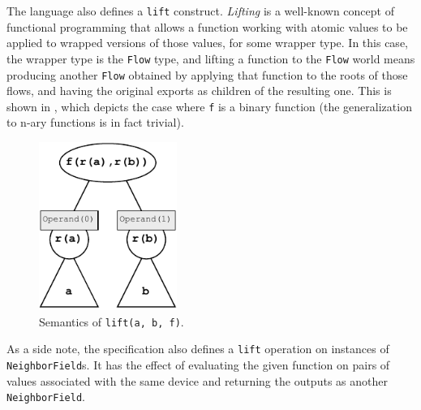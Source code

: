 The language also defines a \texttt{lift} construct.
%
\textit{Lifting} is a well-known concept of functional programming that allows a function working with atomic values to be applied to wrapped versions of those values, for some wrapper type.
%
In this case, the wrapper type is the \texttt{Flow} type, and lifting a function to the \texttt{Flow} world means producing another \texttt{Flow} obtained by applying that function to the roots of those flows, and having the original exports as children of the resulting one.
%
This is shown in , which depicts the case where \texttt{f} is a binary function (the generalization to n-ary functions is in fact trivial).
%
\begin{figure}
    \centering
    \includegraphics[width=0.4\textwidth]{figures/semantics/lift.pdf}
    \caption{Semantics of \texttt{lift(a, b, f)}.}
    \label{fig:semantics-lift}
\end{figure}

As a side note, the specification also defines a \texttt{lift} operation on instances of \texttt{NeighborField}s.
%
It has the effect of evaluating the given function on pairs of values associated with the same device and returning the outputs as another \texttt{NeighborField}.


